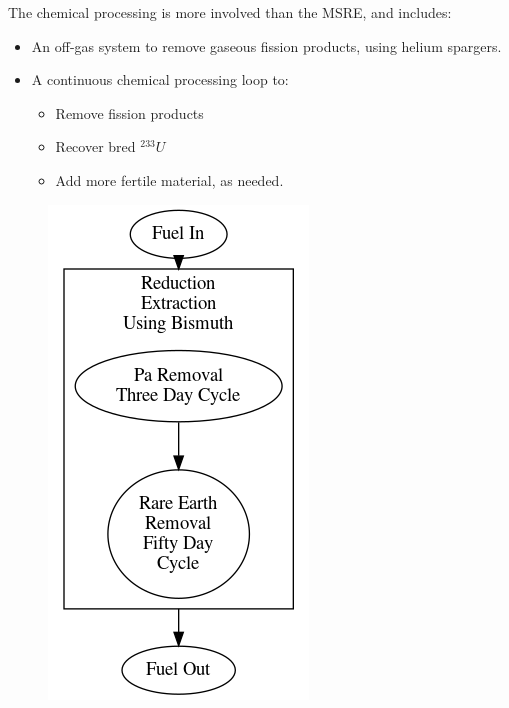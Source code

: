 \documentclass[letterpaper]{article}
\begin{document}
The chemical processing is more involved than the MSRE, and includes:
\begin{itemize}
\item An off-gas system to remove gaseous fission products, using helium spargers.
\item A continuous chemical processing loop to:
	\begin{itemize}
	\item Remove fission products
	\item Recover bred ${}^{233}U$
	\item Add more fertile material, as needed.
	\end{itemize}
\end{itemize}

\begin{figure}[H]
  \centering
  \includegraphics[height=.5\textheight]{figures/msbr-proc.png}
  \label{fig:figC}
\end{figure}
\end{document}
